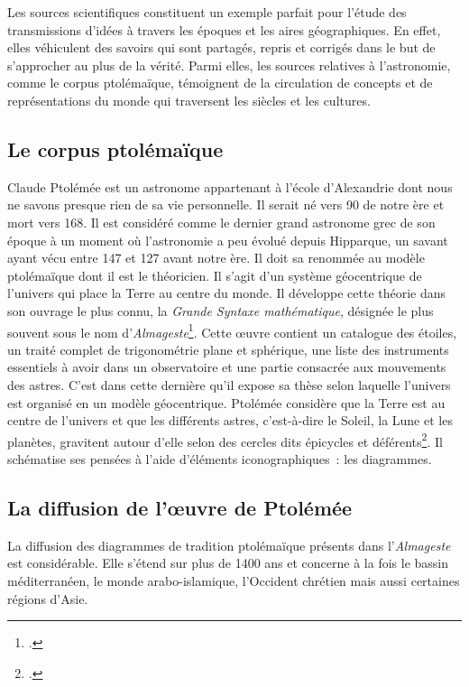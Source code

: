 Les sources scientifiques constituent un exemple parfait pour l'étude des transmissions d'idées à travers les époques et les aires géographiques.
En effet, elles véhiculent des savoirs qui sont partagés, repris et corrigés dans le but de s'approcher au plus de la vérité.
Parmi elles, les sources relatives à l'astronomie, comme le corpus ptolémaïque, témoignent de la circulation de concepts et de représentations du monde qui traversent les siècles et les cultures.

\subsection{Le corpus ptolémaïque}
Claude Ptolémée est un astronome appartenant à l'école d'Alexandrie dont nous ne savons presque rien de sa vie personnelle.
Il serait né vers 90 de notre ère et mort vers 168.
Il est considéré comme le dernier grand astronome grec de son époque à un moment où l'astronomie a peu évolué depuis Hipparque, un savant ayant vécu entre 147 et 127 avant notre ère.
Il doit sa renommée au modèle ptolémaïque dont il est le théoricien.
Il s'agit d'un système géocentrique de l'univers qui place la Terre au centre du monde.
Il développe cette théorie dans son ouvrage le plus connu, la \textit{Grande Syntaxe mathématique}, désignée le plus souvent sous le nom d'\textit{Almageste}\footcite{verdetLaubeLastronomieLaurore1990}.
Cette œuvre contient un catalogue des étoiles, un traité complet de trigonométrie plane et sphérique, une liste des instruments essentiels à avoir dans un observatoire et une partie consacrée aux mouvements des astres.
C'est dans cette dernière qu'il expose sa thèse selon laquelle l'univers est organisé en un modèle géocentrique.
Ptolémée considère que la Terre est au centre de l'univers et que les différents astres, c'est-à-dire le Soleil, la Lune et les planètes, gravitent autour d'elle selon des cercles dits épicycles et déférents\footcite{costabelCLAUDEPTOLEMEE90}.
Il schématise ses pensées à l'aide d'éléments iconographiques~: les diagrammes.

\subsection{La diffusion de l'œuvre de Ptolémée}
La diffusion des diagrammes de tradition ptolémaïque présents dans l'\textit{Almageste} est considérable.
Elle s'étend sur plus de 1400 ans et concerne à la fois le bassin méditerranéen, le monde arabo-islamique, l'Occident chrétien mais aussi certaines régions d'Asie.

